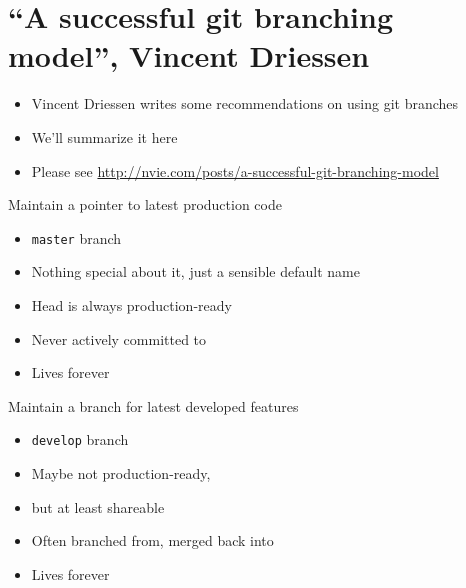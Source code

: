 \documentclass{beamer}
\begin{document}
\section{``A successful git branching model'', Vincent Driessen}

\begin{frame}[plain]
\tableofcontents[currentsection]
\end{frame}


\begin{frame}[plain]
  \begin{itemize}
  \item Vincent Driessen writes some recommendations on using git branches
  \item We'll summarize it here
  \item Please see \url{http://nvie.com/posts/a-successful-git-branching-model}
  \end{itemize}
  
\end{frame}


\begin{frame}[plain]

  Maintain a pointer to latest production code

  \begin{itemize}
  \item {\tt master} branch
  \item Nothing special about it, just a sensible default name
  \item Head is always production-ready
  \item Never actively committed to
  \item Lives forever
  \end{itemize}

\end{frame}

\begin{frame}[plain]

  Maintain a branch for latest developed features

  \begin{itemize}
  \item {\tt develop} branch
  \item Maybe not production-ready,
  \item but at least shareable
  \item Often branched from, merged back into
  \item Lives forever
  \end{itemize}

\end{frame}
\end{document}
